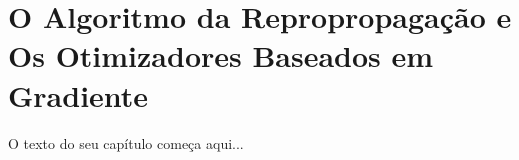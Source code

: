 
\chapter{O Algoritmo da Repropropagação e Os Otimizadores Baseados em Gradiente}
\label{cap:retropropagacao-gradiente}

O texto do seu capítulo começa aqui...